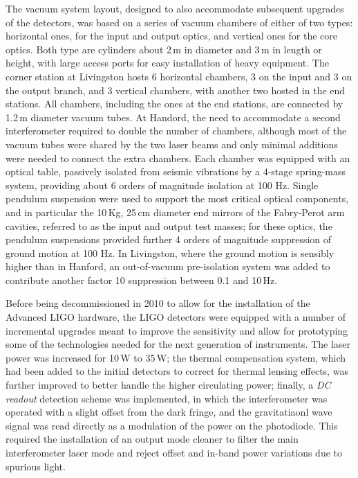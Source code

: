 The vacuum system layout, designed to also accommodate subsequent upgrades of the detectors, was based on a series of vacuum chambers of either of two types: horizontal ones, for the input and output optics, and vertical ones for the core optics.
Both type are cylinders about 2\,m in diameter and 3\,m in length or height, with large access ports for easy installation of heavy equipment.
The corner station at Livingston hosts 6 horizontal chambers, 3 on the input and 3  on the output branch, and 3 vertical chambers, with another two hosted in the end stations.
All chambers, including the ones at the end stations, are connected by 1.2\,m diameter vacuum tubes.
At Handord, the need to accommodate a second interferometer required to double the number of chambers, although most of the vacuum tubes were shared by the two laser beams and only minimal additions were needed to connect the extra chambers.
Each chamber was equipped with an optical table, passively isolated from seismic vibrations by a 4-stage spring-mass system, providing about 6 orders of magnitude isolation at 100 Hz\cite{Giaime_1996}. Single pendulum suspension were used to support the most critical optical components, and in particular the 10\,Kg, 25\,cm diameter end mirrors of the Fabry-Perot arm cavities, referred to as the input and output test masses; for these optics, the pendulum suspensions provided further 4 orders of magnitude suppression of ground motion at 100 Hz.
In Livingston, where the ground motion is sensibly higher than in Hanford, an out-of-vacuum pre-isolation system was added to contribute another factor 10 suppression between 0.1 and 10\,Hz.

Before being decommissioned in 2010 to allow for the installation of the Advanced LIGO hardware, the LIGO detectors were equipped with a number of incremental upgrades\cite{Aasi_2015} meant to improve the sensitivity and allow for prototyping some of the technologies needed for the next generation of instruments.
The laser power was increased for 10\,W to 35\,W;
the thermal compensation system, which had been added to the initial detectors to correct for thermal lensing effects, was further improved to better handle the higher circulating power;
finally, a \textit{DC readout} detection scheme was implemented, in which the interferometer was operated with a slight offset from the dark fringe, and the gravitatiaonl wave signal was read directly as a modulation of the power on the photodiode.
This required the installation of an output mode cleaner to filter the main interferometer laser mode and reject offset and in-band power variations due to spurious light.

